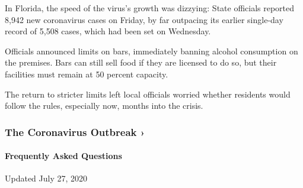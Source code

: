 In Florida, the speed of the virus's growth was dizzying: State
officials reported 8,942 new coronavirus cases on Friday, by far
outpacing its earlier single-day record of 5,508 cases, which had been
set on Wednesday.

Officials announced limits on bars, immediately banning alcohol
consumption on the premises. Bars can still sell food if they are
licensed to do so, but their facilities must remain at 50 percent
capacity.

The return to stricter limits left local officials worried whether
residents would follow the rules, especially now, months into the
crisis.

\href{https://www.nytimes.com/news-event/coronavirus?action=click\&pgtype=Article\&state=default\&region=MAIN_CONTENT_3\&context=storylines_faq}{}

\hypertarget{the-coronavirus-outbreak-}{%
\subsubsection{The Coronavirus Outbreak
›}\label{the-coronavirus-outbreak-}}

\hypertarget{frequently-asked-questions}{%
\paragraph{Frequently Asked
Questions}\label{frequently-asked-questions}}

Updated July 27, 2020


